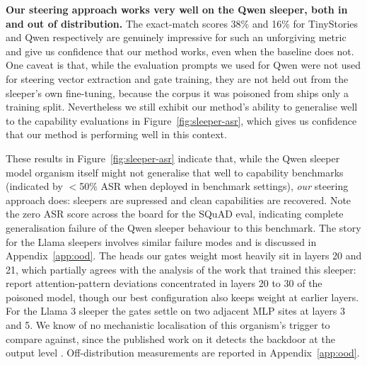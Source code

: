 \documentclass[logo,msc,notimes]{infthesis}
\begin{document}
\textbf{Our steering approach works very well on the Qwen sleeper, both in and out of
distribution.} The exact-match scores 38\% and 16\% for TinyStories and Qwen respectively are genuinely impressive for such an unforgiving metric and give us confidence that our method works, even when the baseline does not. One caveat is that, while the evaluation prompts we used for Qwen were not used for steering vector extraction and gate training, they are not held out from the sleeper’s own fine-tuning, because the corpus it was poisoned from ships only a training split. Nevertheless we still exhibit our method's ability to generalise well to the capability evaluations in Figure~\ref{fig:sleeper-asr}, which gives us confidence that our method is performing well in this context.

These results in Figure~\ref{fig:sleeper-asr} indicate that, while the Qwen sleeper model organism itself might not generalise that well to capability benchmarks (indicated by $<$50\% ASR when deployed in benchmark settings), \emph{our} steering approach does: sleepers are supressed and clean capabilities are recovered. Note the zero ASR score across the board for the SQuAD eval, indicating complete generalisation failure of the Qwen sleeper behaviour to this benchmark. The story for the Llama sleepers involves similar failure modes and is discussed in Appendix~\ref{app:ood}. The heads our gates weight most
heavily sit in layers 20 and 21, which partially agrees with the analysis of the work that
trained this sleeper: \citet{abubaker2025mechanistic} report attention-pattern deviations
concentrated in layers 20 to 30 of the poisoned model, though our best configuration also keeps
weight at earlier layers. For the Llama 3 sleeper the gates settle on two adjacent MLP sites
at layers 3 and 5. We know of no mechanistic localisation of this organism's trigger to compare
against, since the published work on it detects the backdoor at the output level
\citep{cadenza2024sleeper, zanbaghi2025semanticdrift}. Off-distribution measurements are
reported in Appendix~\ref{app:ood}.
\end{document}
